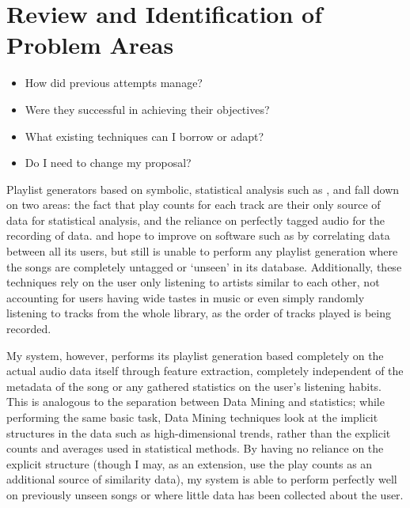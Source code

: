 \section{Review and Identification of Problem Areas}
\begin{itemize}
	\item How did previous attempts manage?
	\item Were they successful in achieving their objectives?
	\item What existing techniques can I borrow or adapt?
	\item Do I need to change my proposal?
\end{itemize}
Playlist generators based on symbolic, statistical analysis such as ,  and  fall down on two areas: the fact that play counts for each track are their only source of data for statistical analysis, and the reliance on perfectly tagged audio for the recording of data.  and  hope to improve on software such as  by correlating data between all its users, but still is unable to perform any playlist generation where the songs are completely untagged or `unseen' in its database. Additionally, these techniques rely on the user only listening to artists similar to each other, not accounting for users having wide tastes in music or even simply randomly listening to tracks from the whole library, as the order of tracks played is being recorded.

My system, however, performs its playlist generation based completely on the actual audio data itself through feature extraction, completely independent of the metadata of the song or any gathered statistics on the user's listening habits. This is analogous to the separation between Data Mining and statistics; while performing the same basic task, Data Mining techniques look at the implicit structures in the data such as high-dimensional trends, rather than the explicit counts and averages used in statistical methods. By having no reliance on the explicit structure (though I may, as an extension, use the play counts as an additional source of similarity data), my system is able to perform perfectly well on previously unseen songs or where little data has been collected about the user.


